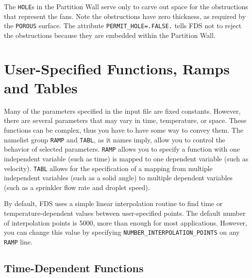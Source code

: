 \documentclass[11pt]{book}
\newcommand{\ct}{\tt\small}
\begin{document}
The {\ct HOLE}s in the Partition Wall serve only to carve out space for the obstructions
that represent the fans. Note the obstructions have zero thickness, as
required by the {\ct POROUS} surface. The attribute {\ct PERMIT\_HOLE=.FALSE.} tells FDS not to reject the obstructions because
they are embedded within the Partition Wall.








\chapter{User-Specified Functions, Ramps and Tables}
\label{info:RAMP}


Many of the parameters specified in the input file are fixed constants. However, there are several parameters that may vary in
time, temperature, or space. These functions can be complex, thus you have to have some way to convey them. The namelist group
{\ct RAMP} and {\ct TABL}, as it names imply, allow you to control the behavior of selected parameters.  {\ct RAMP} allows you
to specify a function with one independent variable (such as time) is mapped to one dependent variable (such as velocity).
{\ct TABL} allows for the specification of a mapping from multiple independent variables (such as a solid angle) to multiple
dependent variables (such as a sprinkler flow rate and droplet speed).

By default, FDS uses a simple linear interpolation routine to find time or temperature-dependent values between user-specified points.
The default number of interpolation points is 5000, more than enough for most applications. However, you can change this value
by specifying {\ct NUMBER\_INTERPOLATION\_POINTS} on any {\ct RAMP} line.

\section{Time-Dependent Functions}

\label{info:RAMP_Time}
\end{document}
